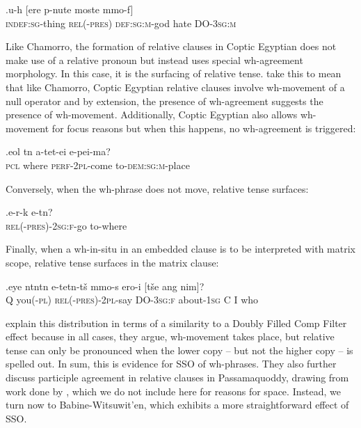 \documentclass[11pt]{article}
\begin{document}
\exg.\label{wh.150}u-h{\textopeno\textbeta} [ere p-nute moste mmo-f]\\
   \textsc{indef:sg}-thing \textsc{rel(-pres)} \textsc{def:sg:m}-god hate DO-\textsc{3sg:m}\\

Like Chamorro, the formation of relative clauses in Coptic Egyptian does not make use of a relative pronoun but instead uses special wh-agreement morphology. In this case, it is the surfacing of relative tense. \cite{rlc:2006} take this to mean that like Chamorro, Coptic Egyptian relative clauses involve wh-movement of a null operator and by extension, the presence of wh-agreement suggests the presence of wh-movement. Additionally, Coptic Egyptian also allows wh-movement for focus reasons but when this happens, no wh-agreement is triggered:

\exg.\label{wh.160}e{\textbeta}ol t{\textopeno}n a-tet{\textschwa}-ei e-pei-ma?\\
   \textsc{pcl} where \textsc{perf-2pl}-come to-\textsc{dem:sg:m}-place\\

Conversely, when the wh-phrase does not move, relative tense surfaces:

\exg.\label{wh.170}e-r-{\textbeta\textepsilon}k e-t{\textopeno}n?\\
   \textsc{rel(-pres)-2sg:f}-go to-where\\

Finally, when a wh-in-situ in an embedded clause is to be interpreted with matrix scope, relative tense surfaces in the matrix clause:

\exg.\label{wh.180}eye {\textschwa}nt{\textopeno}nt{\textschwa}n e-tet{\textschwa}n-t\v{s}{\textopeno} {\textschwa}mmo-s ero-i [t\v{s}e ang nim]?\\
   Q you(\textsc{-pl}) \textsc{rel(-pres)-2pl}-say DO-\textsc{3sg:f} about-\textsc{1sg} C I who\\

\cite{rlc:2006} explain this distribution in terms of a similarity to a Doubly Filled Comp Filter effect \citep{chomsky-lasnik:1977} because in all cases, they argue, wh-movement takes place, but relative tense can only be pronounced when the lower copy -- but not the higher copy -- is spelled out. In sum, this is evidence for SSO of wh-phrases. They also further discuss participle agreement in relative clauses in Passamaquoddy, drawing from work done by \cite{bruening:2001}, which we do not include here for reasons for space. Instead, we turn now to Babine-Witsuwit'en, which exhibits a more straightforward effect of SSO.
\end{document}
